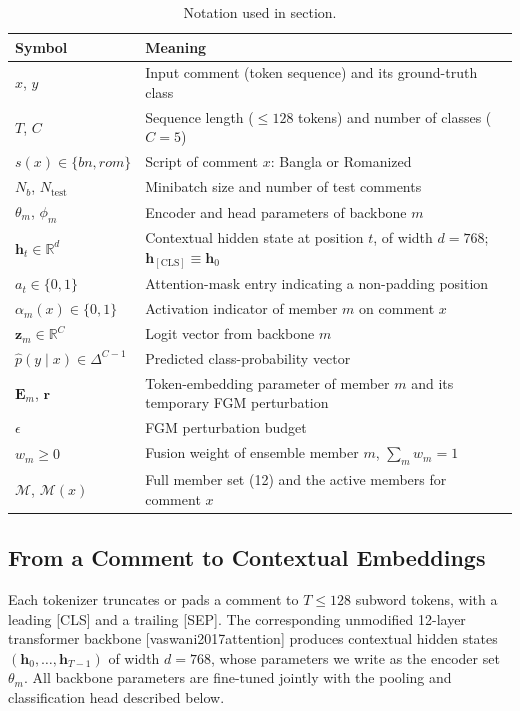 \documentclass[11pt,a4paper]{article}
\def\citep#1{[#1]}%
\def\cref#1{section}%
\def\texttt#1{#1}%
\def\textsc#1{#1}%
\begin{document}
\begin{table}[!htbp]
\centering
\caption{Notation used in \cref{sec:methodology}.}
\label{tab:notation}
\small
\begin{tabularx}{\textwidth}{@{}lX@{}}
\toprule
\textbf{Symbol} & \textbf{Meaning} \\
\midrule
$x$, $y$ & Input comment (token sequence) and its ground-truth class \\
$T$, $C$ & Sequence length ($\le 128$ tokens) and number of classes ($C = 5$) \\
$s(x) \in \{\textsc{bn}, \textsc{rom}\}$ & Script of comment $x$: Bangla or Romanized \\
$N_b$, $N_{\mathrm{test}}$ & Minibatch size and number of test comments \\
$\theta_m$, $\phi_m$ & Encoder and head parameters of backbone $m$ \\
$\mathbf{h}_t \in \mathbb{R}^{d}$ & Contextual hidden state at position $t$, of width $d = 768$; $\mathbf{h}_{[\mathrm{CLS}]} \equiv \mathbf{h}_0$ \\
$a_t \in \{0,1\}$ & Attention-mask entry indicating a non-padding position \\
$\alpha_m(x) \in \{0,1\}$ & Activation indicator of member $m$ on comment $x$ \\
$\mathbf{z}_m \in \mathbb{R}^{C}$ & Logit vector from backbone $m$ \\
$\hat{p}(y \mid x) \in \Delta^{C-1}$ & Predicted class-probability vector \\
$\mathbf{E}_m$, $\mathbf{r}$ & Token-embedding parameter of member $m$ and its temporary FGM perturbation \\
$\epsilon$ & FGM perturbation budget \\
$w_m \ge 0$ & Fusion weight of ensemble member $m$, $\sum_m w_m = 1$ \\
$\mathcal{M}$, $\mathcal{M}(x)$ & Full member set (12) and the active members for comment $x$ \\
\bottomrule
\end{tabularx}
\end{table}

\subsection{From a Comment to Contextual Embeddings}
\label{sec:prelim}

Each tokenizer truncates or pads a comment to $T \le 128$ subword tokens, with a leading \texttt{[CLS]} and a trailing \texttt{[SEP]}. The corresponding unmodified 12-layer transformer backbone \citep{vaswani2017attention} produces contextual hidden states $(\mathbf{h}_0,\ldots,\mathbf{h}_{T-1})$ of width $d = 768$, whose parameters we write as the encoder set $\theta_m$. All backbone parameters are fine-tuned jointly with the pooling and classification head described below.
\end{document}
